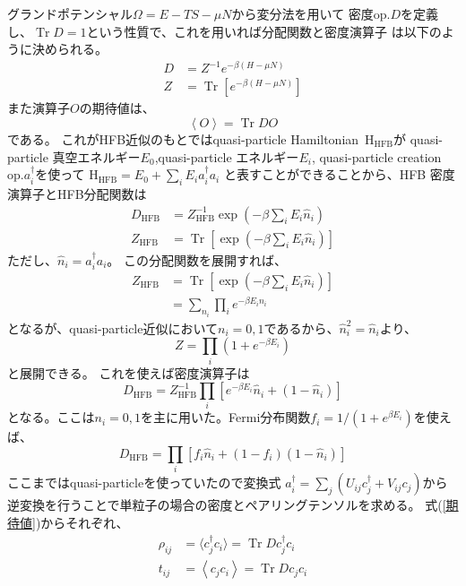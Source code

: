 \documentclass[a4paper,11pt]{jsreport}
\begin{document}
  グランドポテンシャル$\Omega=E- TS -\mu N$から変分法を用いて
  密度op.$D$を定義し、$\operatorname{Tr}D=1$という性質で、これを用いれば分配関数と密度演算子
  は以下のように決められる。
  \begin{align}
    D &= Z^{-1}e^{-\beta(H-\mu N)}\\
    Z &= \operatorname{Tr}\left[e^{-\beta(H-\mu N)}\right]
  \end{align}
  また演算子$O$の期待値は、
  \begin{equation}
    \left\langle O\right\rangle=\operatorname{Tr}DO\label{期待値}
  \end{equation}
  である。
  これがHFB近似のもとではquasi-particle Hamiltonian\ $\operatorname{H_{\text{HFB}}}$が
  quasi-particle 真空エネルギー$E_0$,quasi-particle エネルギー$E_i$,
  quasi-particle creation op.$a_i^{\dagger}$を使って
  $\operatorname{H_{\text{HFB}}}=E_0 + \sum_{i}E_i a_i^{\dagger}a_i$
  と表すことができることから、HFB 密度演算子とHFB分配関数は
  \begin{align}
    D_{\text{HFB}} &= Z_{\text{HFB}}^{-1}\exp\left(-\beta \sum_i E_i \hat{n}_i\right)\\
    Z_{\text{HFB}} &= \operatorname{Tr}\left[\exp\left(-\beta \sum_i E_i \hat{n}_i\right)\right]
  \end{align}
  ただし、$\hat{n}_i = a_i^{\dagger}a_i$。
  この分配関数を展開すれば、
  \begin{align}
    Z_{\text{HFB}} &= \operatorname{Tr}\left[\exp\left(-\beta \sum_i E_i \hat{n}_i\right)\right]\\
    &= \sum_{n_i}\prod _{i} e^{-\beta E_i n_i}
  \end{align}
  となるが、quasi-particle近似において$n_i=0,1$であるから、$\hat{n}_i^2=\hat{n}_i$より、
  \begin{equation}
    Z=\prod _{i} \left(1 + e^{-\beta E_i}\right)
  \end{equation}
  と展開できる。
  これを使えば密度演算子は
  \begin{equation}
    D_{\text{HFB}} = Z_{\text{HFB}}^{-1}\prod _{i}
    \left[e^{-\beta E_i}\hat{n}_i + (1 - \hat{n}_i)\right]
  \end{equation}
  となる。ここは$n_i=0,1$を主に用いた。Fermi分布関数$f_i=1/(1 + e^{\beta E_i})$を使えば、
  \begin{equation}
    D_{\text{HFB}}=\prod_i \left[f_i\hat{n}_i+(1 - f_i)(1 - \hat{n}_i)\right]
  \end{equation}
  ここまではquasi-particleを使っていたので変換式
  $a_i^{\dagger} = \sum_{j}(U_{ij}c_j^{\dagger}+V_{ij}c_j)$から
  逆変換を行うことで単粒子の場合の密度とペアリングテンソルを求める。
  式(\ref{期待値})からそれぞれ、
  \begin{align}
    \rho_{ij} &= \langle c_j^\dagger c_i\rangle=\operatorname{Tr}D c_j^\dagger c_i\\
    t_{ij}    &= \left\langle c_j c_i\right\rangle=\operatorname{Tr}D c_j c_i
  \end{align}
\end{document}
